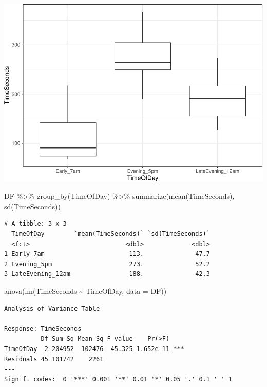 \documentclass[
]{article}
\newenvironment{Shaded}{\begin{snugshade}}{\end{snugshade}}
\newcommand{\AttributeTok}[1]{\textcolor[rgb]{0.77,0.63,0.00}{#1}}
\newcommand{\FunctionTok}[1]{\textcolor[rgb]{0.00,0.00,0.00}{#1}}
\newcommand{\NormalTok}[1]{#1}
\newcommand{\SpecialCharTok}[1]{\textcolor[rgb]{0.00,0.00,0.00}{#1}}
\begin{document}
\begin{center}\includegraphics{SDM-CHAP25_files/figure-latex/unnamed-chunk-2-1} \end{center}

\begin{Shaded}
\begin{Highlighting}[]
\NormalTok{DF }\SpecialCharTok{\%\textgreater{}\%} 
  \FunctionTok{group\_by}\NormalTok{(TimeOfDay) }\SpecialCharTok{\%\textgreater{}\%} 
  \FunctionTok{summarize}\NormalTok{(}\FunctionTok{mean}\NormalTok{(TimeSeconds), }\FunctionTok{sd}\NormalTok{(TimeSeconds))}
\end{Highlighting}
\end{Shaded}

\begin{verbatim}
# A tibble: 3 x 3
  TimeOfDay        `mean(TimeSeconds)` `sd(TimeSeconds)`
  <fct>                          <dbl>             <dbl>
1 Early_7am                       113.              47.7
2 Evening_5pm                     273.              52.2
3 LateEvening_12am                188.              42.3
\end{verbatim}

\begin{Shaded}
\begin{Highlighting}[]
\FunctionTok{anova}\NormalTok{(}\FunctionTok{lm}\NormalTok{(TimeSeconds }\SpecialCharTok{\textasciitilde{}}\NormalTok{ TimeOfDay, }\AttributeTok{data =}\NormalTok{ DF))}
\end{Highlighting}
\end{Shaded}

\begin{verbatim}
Analysis of Variance Table

Response: TimeSeconds
          Df Sum Sq Mean Sq F value    Pr(>F)    
TimeOfDay  2 204952  102476  45.325 1.652e-11 ***
Residuals 45 101742    2261                      
---
Signif. codes:  0 '***' 0.001 '**' 0.01 '*' 0.05 '.' 0.1 ' ' 1
\end{verbatim}
\end{document}
